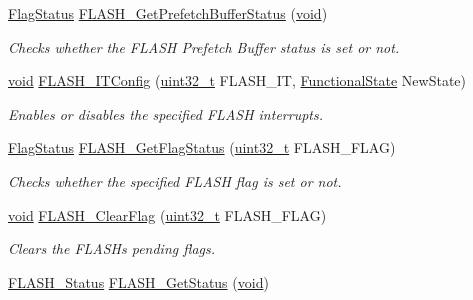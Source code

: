 \begin{DoxyCompactItemize}
\hyperlink{agilefox_2library_2inc_2stm32f10x__type_8h_a89136caac2e14c55151f527ac02daaff}{Flag\+Status} \hyperlink{group___f_l_a_s_h___exported___functions_ga289bffe7f078d6a130222f03c59bc235}{F\+L\+A\+S\+H\+\_\+\+Get\+Prefetch\+Buffer\+Status} (\hyperlink{usb__devapi_8h_afabf60e7f57651d6d595a02c75f07cd0}{void})
\begin{DoxyCompactList}\small\item\em Checks whether the F\+L\+A\+SH Prefetch Buffer status is set or not. \end{DoxyCompactList}\item 
\hyperlink{usb__devapi_8h_afabf60e7f57651d6d595a02c75f07cd0}{void} \hyperlink{group___f_l_a_s_h___exported___functions_ga94c1e51a9c3bf8d48eb6eb4a4d054861}{F\+L\+A\+S\+H\+\_\+\+I\+T\+Config} (\hyperlink{_p_e___types_8h_a33594304e786b158f3fb30289278f5af}{uint32\+\_\+t} F\+L\+A\+S\+H\+\_\+\+IT, \hyperlink{agilefox_2library_2inc_2stm32f10x__type_8h_ac9a7e9a35d2513ec15c3b537aaa4fba1}{Functional\+State} New\+State)
\begin{DoxyCompactList}\small\item\em Enables or disables the specified F\+L\+A\+SH interrupts. \end{DoxyCompactList}\item 
\hyperlink{agilefox_2library_2inc_2stm32f10x__type_8h_a89136caac2e14c55151f527ac02daaff}{Flag\+Status} \hyperlink{group___f_l_a_s_h___exported___functions_gae3fb545e32f21501ca27d4380e0f2088}{F\+L\+A\+S\+H\+\_\+\+Get\+Flag\+Status} (\hyperlink{_p_e___types_8h_a33594304e786b158f3fb30289278f5af}{uint32\+\_\+t} F\+L\+A\+S\+H\+\_\+\+F\+L\+AG)
\begin{DoxyCompactList}\small\item\em Checks whether the specified F\+L\+A\+SH flag is set or not. \end{DoxyCompactList}\item 
\hyperlink{usb__devapi_8h_afabf60e7f57651d6d595a02c75f07cd0}{void} \hyperlink{group___f_l_a_s_h___exported___functions_gac4be1d486483fa5cd70ec77d44ca8f87}{F\+L\+A\+S\+H\+\_\+\+Clear\+Flag} (\hyperlink{_p_e___types_8h_a33594304e786b158f3fb30289278f5af}{uint32\+\_\+t} F\+L\+A\+S\+H\+\_\+\+F\+L\+AG)
\begin{DoxyCompactList}\small\item\em Clears the F\+L\+A\+SH\textquotesingle{}s pending flags. \end{DoxyCompactList}\item 
\hyperlink{group___f_l_a_s_h___exported___types_gadc63a6f3404ff1f71229a66915e9cdc0}{F\+L\+A\+S\+H\+\_\+\+Status} \hyperlink{group___f_l_a_s_h___exported___functions_gac265b8d1e7ea11e44ceee28797c3debb}{F\+L\+A\+S\+H\+\_\+\+Get\+Status} (\hyperlink{usb__devapi_8h_afabf60e7f57651d6d595a02c75f07cd0}{void})

\end{DoxyCompactItemize}
